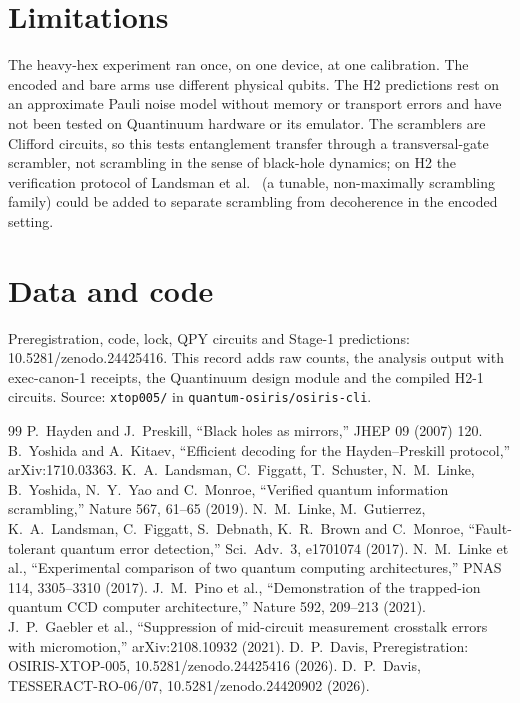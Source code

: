 \documentclass[10pt,twocolumn]{article}
\begin{document}
\section{Limitations}
The heavy-hex experiment ran once, on one device, at one calibration. The encoded and bare arms use
different physical qubits. The H2 predictions rest on an approximate Pauli noise model without memory
or transport errors and have not been tested on Quantinuum hardware or its emulator. The scramblers
are Clifford circuits, so this tests entanglement transfer through a transversal-gate scrambler, not
scrambling in the sense of black-hole dynamics; on H2 the verification protocol of Landsman et
al.~\cite{landsman} (a tunable, non-maximally scrambling family) could be added to separate scrambling from
decoherence in the encoded setting.

\section{Data and code}
Preregistration, code, lock, QPY circuits and Stage-1 predictions: 10.5281/zenodo.24425416. This record
adds raw counts, the analysis output with exec-canon-1 receipts, the Quantinuum design module and the
compiled H2-1 circuits. Source: \texttt{xtop005/} in \texttt{quantum-osiris/osiris-cli}.

\begin{thebibliography}{99}\small
{} P.~Hayden and J.~Preskill, ``Black holes as mirrors,'' JHEP 09 (2007) 120.
 B.~Yoshida and A.~Kitaev, ``Efficient decoding for the Hayden--Preskill protocol,''
arXiv:1710.03363.
 K.~A.~Landsman, C.~Figgatt, T.~Schuster, N.~M.~Linke, B.~Yoshida, N.~Y.~Yao and
C.~Monroe, ``Verified quantum information scrambling,'' Nature 567, 61--65 (2019).
 N.~M.~Linke, M.~Gutierrez, K.~A.~Landsman, C.~Figgatt, S.~Debnath, K.~R.~Brown and
C.~Monroe, ``Fault-tolerant quantum error detection,'' Sci.\ Adv.\ 3, e1701074 (2017).
 N.~M.~Linke et al., ``Experimental comparison of two quantum computing
architectures,'' PNAS 114, 3305--3310 (2017).
 J.~M.~Pino et al., ``Demonstration of the trapped-ion quantum CCD computer
architecture,'' Nature 592, 209--213 (2021).
 J.~P.~Gaebler et al., ``Suppression of mid-circuit measurement crosstalk errors with
micromotion,'' arXiv:2108.10932 (2021).
 D.~P.~Davis, Preregistration: OSIRIS-XTOP-005, 10.5281/zenodo.24425416 (2026).
 D.~P.~Davis, TESSERACT-RO-06/07, 10.5281/zenodo.24420902 (2026).
\end{thebibliography}
\end{document}

